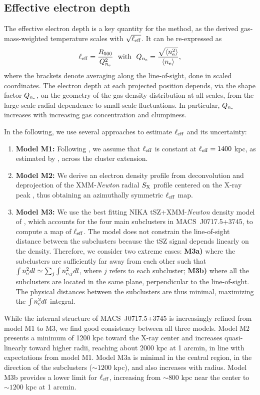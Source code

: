 \documentclass[twocolumn,traditabstract]{aa}
\def\xe {n_{\rm e}}
\begin{document}
\subsection{Effective electron depth}
The effective electron depth is a key quantity for the method, as the derived gas-mass-weighted temperature scales with $\sqrt{\ell_{\rm eff}}$. It can be re-expressed as
\begin{equation}
\ell_{\rm eff} = \frac{R_{500}}{Q_{n_{\rm e}}^2}~~{\rm with}~~Q_{n_{\rm e}} = \frac{ \sqrt{\langle \xe^2\rangle}}{ \langle\xe\rangle},
\label{eq:Q_ne}
\end{equation}
where the brackets denote averaging along the line-of-sight, done in scaled coordinates. The electron depth at each projected position depends, via the shape factor $Q_{n_{\rm e}}$, on the geometry of the gas density distribution at all scales, from the large-scale radial dependence to small-scale fluctuations. In particular, $Q_{n_{\rm e}}$ increases with increasing gas concentration and clumpiness.

In the following, we use several approaches to estimate $\ell_{\rm eff}$ and its uncertainty:
\begin{enumerate}
\item {\bf Model M1:} Following \cite{Sayers2013}, we assume that $\ell_{\rm eff}$ is constant at $\ell_{\rm eff}=1400$ kpc, as estimated by \citet{Mroczkowski2012}, across the cluster extension. 
\item {\bf Model M2:} We derive an electron density profile from deconvolution and deprojection of the XMM-\textit{Newton} radial $S_{\rm X}$ profile centered on the X-ray peak \citep{Croston2006}, thus obtaining an azimuthally symmetric $\ell_{\rm eff}$ map. 
\item {\bf Model M3:} We use the best fitting NIKA tSZ+XMM-\textit{Newton} density model of \cite{Adam2016b}, which accounts for the four main subclusters in \mbox{MACS~J0717.5+3745}, to compute a map of $\ell_{\rm eff}$. The model does not constrain the line-of-sight distance between the subclusters because the tSZ signal depends linearly on the density. Therefore, we consider two extreme cases: {\bf M3a)} where the subclusters are sufficiently far away from each other such that $\int n_{\rm e}^2 dl \simeq \sum_j \int n_{{\rm e},j}^2 dl$, where $j$ refers to each subcluster; {\bf M3b)} where all the subclusters are located in the same plane, perpendicular to the line-of-sight. The physical distances between the subclusters are thus minimal, maximizing the $\int n_{\rm e}^2 dl$ integral.
\end{enumerate}
While the internal structure of \mbox{MACS~J0717.5+3745} is increasingly refined from model M1 to M3, we find good consistency between all three models. Model M2 presents a minimum of 1200 kpc toward the X-ray center and increases quasi-linearly toward higher radii, reaching about 2000 kpc at 1 arcmin, in line with expectations from model M1. Model M3a is minimal in the central region, in the direction of the subclusters ($\sim 1200$ kpc), and also increases with radius. Model M3b provides a lower limit for $\ell_{\rm eff}$, increasing from $\sim 800$ kpc near the center to $\sim 1200$ kpc at 1 arcmin.
\end{document}

